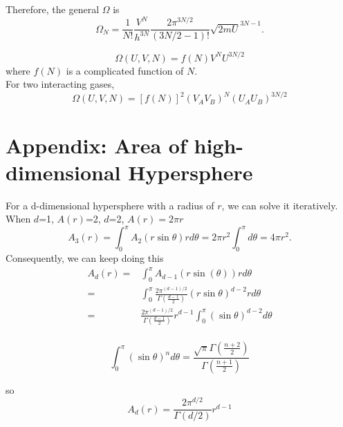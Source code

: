 Therefore, the general $\Omega$ is
\begin{equation} 
\Omega_N = \frac{1}{N!} \frac{V^N}{h^{3N}} \frac{2\pi^{3N/2}}{(3N/2-1)!} \sqrt{2mU}^{3N-1}. 
\end{equation}


\begin{equation}
\Omega(U,V,N) = f(N)V^NU^{3N/2}
\end{equation}
where $f(N)$ is a complicated function of $N$.\\

For two interacting gases,
\begin{equation}
\Omega(U,V,N) = [f(N)]^2(V_AV_B)^N(U_AU_B)^{3N/2}
\end{equation}


\section{Appendix: Area of high-dimensional Hypersphere}
For a d-dimensional hypersphere with a radius of $r$, we can solve it iteratively.
When $d$=1, $A(r)$=2, $d$=2, $A(r)=2\pi r$
\begin{equation}
    A_3(r) = \int_0^{\pi} A_2(r\sin\theta)rd\theta = 2\pi r^2 \int_0^{\pi}d\theta = 4\pi r^2.
\end{equation}
Consequently, we can keep doing this
\begin{equation}
\begin{split}
    A_d(r) = & \int_0^\pi{A_{d-1}(r\sin(\theta))rd\theta} \\
           = & \int_0^\pi\frac{2\pi^{(d-1)/2}}{\Gamma(\frac{d-1}{2})}(r\sin\theta)^{d-2}rd\theta \\
           = & \frac{2\pi^{(d-1)/2}}{\Gamma(\frac{d-1}{2})}r^{d-1} \int_0^{\pi}(\sin\theta)^{d-2}d\theta\\
\end{split}
\end{equation}

\begin{equation}
    \int_0^{\pi} (\sin\theta)^nd\theta = \frac{\sqrt{\pi}\Gamma(\frac{n+2}{2})}{\Gamma(\frac{n+1}{2})}
\end{equation}

so
\begin{equation}
    A_d(r) = \frac{2\pi^{d/2}}{\Gamma(d/2)}r^{d-1}
\end{equation}

